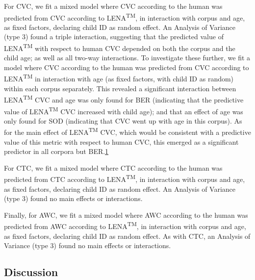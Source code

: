 \documentclass[english,floatsintext,man]{apa6}
\begin{document}
For CVC, we fit a mixed model where CVC according to the human was
predicted from CVC according to LENA\textsuperscript{TM}, in interaction
with corpus and age, as fixed factors, declaring child ID as random
effect. An Analysis of Variance (type 3) found a triple interaction,
suggesting that the predicted value of LENA\textsuperscript{TM} with
respect to human CVC depended on both the corpus and the child age; as
well as all two-way interactions. To investigate these further, we fit a
model where CVC according to the human was predicted from CVC according
to LENA\textsuperscript{TM} in interaction with age (as fixed factors,
with child ID as random) within each corpus separately. This revealed a
significant interaction between LENA\textsuperscript{TM} CVC and age was
only found for BER (indicating that the predictive value of
LENA\textsuperscript{TM} CVC increased with child age); and that an
effect of age was only found for SOD (indicating that CVC went up with
age in this corpus). As for the main effect of LENA\textsuperscript{TM}
CVC, which would be consistent with a predictive value of this metric
with respect to human CVC, this emerged as a significant predictor in
all corpora but
BER.\href{For\%20both\%20BER\%20and\%20WAR,\%20the\%20variance\%20associated\%20to\%20the\%20child\%20ID\%20random\%20factor\%20was\%20zero.\%20This\%20suggests\%20a\%20mixed\%20model\%20was\%20not\%20necessary,\%20as\%20child\%20ID\%20is\%20not\%20explaining\%20any\%20additional\%20variance\%20in\%20this\%20corpora,\%20but\%20this\%20does\%20not\%20alter\%20the\%20interpretation\%20in\%20the\%20main\%20text.}{1}

For CTC, we fit a mixed model where CTC according to the human was
predicted from CTC according to LENA\textsuperscript{TM}, in interaction
with corpus and age, as fixed factors, declaring child ID as random
effect. An Analysis of Variance (type 3) found no main effects or
interactions.

Finally, for AWC, we fit a mixed model where AWC according to the human
was predicted from AWC according to LENA\textsuperscript{TM}, in
interaction with corpus and age, as fixed factors, declaring child ID as
random effect. As with CTC, an Analysis of Variance (type 3) found no
main effects or interactions.

\subsection{Discussion}\label{discussion}
\end{document}
